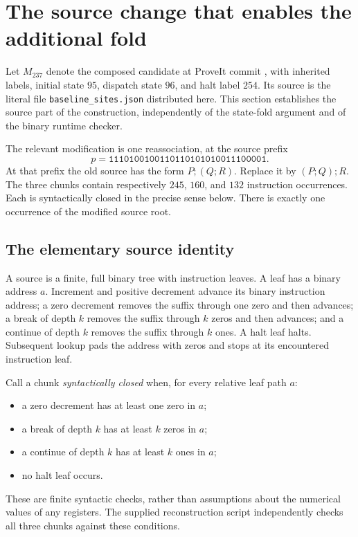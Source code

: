 \section{The source change that enables the additional fold}
\label{sec:source-rotation}

Let $M_{237}$ denote the composed candidate at ProveIt commit
, with inherited labels,
initial state $95$, dispatch state $96$, and halt label $254$.
Its source is the literal file \texttt{baseline\_sites.json} distributed here.
This section establishes the source part of the construction, independently of
the state-fold argument and of the binary runtime checker.

The relevant modification is one reassociation, at the source prefix
\[
 p=\texttt{1110100100110110101010011100001}.
\]
At that prefix the old source has the form $P;(Q;R)$.  Replace it by
$(P;Q);R$.  The three chunks contain respectively $245$, $160$, and $132$
instruction occurrences.  Each is syntactically closed in the precise sense
below.  There is exactly one occurrence of the modified source root.

\subsection{The elementary source identity}

A source is a finite, full binary tree with instruction leaves.  A leaf has a
binary address $a$.  Increment and positive decrement advance its binary
instruction address; a zero decrement removes the suffix through one zero and
then advances; a break of depth $k$ removes the suffix through $k$ zeros and then
advances; and a continue of depth $k$ removes the suffix through $k$ ones.
A halt leaf halts.  Subsequent lookup pads the address with zeros and stops at
its encountered instruction leaf.

Call a chunk \emph{syntactically closed} when, for every relative leaf path $a$:
\begin{itemize}
\item a zero decrement has at least one zero in $a$;
\item a break of depth $k$ has at least $k$ zeros in $a$;
\item a continue of depth $k$ has at least $k$ ones in $a$;
\item no halt leaf occurs.
\end{itemize}
These are finite syntactic checks, rather than assumptions about the numerical
values of any registers.  The supplied reconstruction script independently
checks all three chunks against these conditions.


